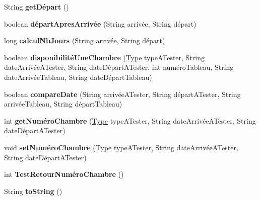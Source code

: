\begin{DoxyCompactItemize}
\item 
String {\bfseries get\+Départ} ()\hypertarget{classchambre_1_1_chambre_ac4f1540d86b148a6bcf83d84f3c5a512}{}\label{classchambre_1_1_chambre_ac4f1540d86b148a6bcf83d84f3c5a512}

\item 
boolean {\bfseries départ\+Apres\+Arrivée} (String arrivée, String départ)\hypertarget{classchambre_1_1_chambre_a9743685f40e65b19febe5d88e4833a0b}{}\label{classchambre_1_1_chambre_a9743685f40e65b19febe5d88e4833a0b}

\item 
long {\bfseries calcul\+Nb\+Jours} (String arrivée, String départ)\hypertarget{classchambre_1_1_chambre_a793aabc721c19132c61965d903994ac1}{}\label{classchambre_1_1_chambre_a793aabc721c19132c61965d903994ac1}

\item 
boolean {\bfseries disponibilité\+Une\+Chambre} (\hyperlink{enumchambre_1_1_chambre_1_1_type}{Type} type\+A\+Tester, String date\+Arrivée\+A\+Tester, String date\+Départ\+A\+Tester, int numéro\+Tableau, String date\+Arrivée\+Tableau, String date\+Départ\+Tableau)\hypertarget{classchambre_1_1_chambre_af0f6b23009a6ccc1a14fa158d89314ab}{}\label{classchambre_1_1_chambre_af0f6b23009a6ccc1a14fa158d89314ab}

\item 
boolean {\bfseries compare\+Date} (String arrivée\+A\+Tester, String départ\+A\+Tester, String arrivée\+Tableau, String départ\+Tableau)\hypertarget{classchambre_1_1_chambre_ad1af4648ca1f52439d13c10549e0fbcf}{}\label{classchambre_1_1_chambre_ad1af4648ca1f52439d13c10549e0fbcf}

\item 
int {\bfseries get\+Numéro\+Chambre} (\hyperlink{enumchambre_1_1_chambre_1_1_type}{Type} type\+A\+Tester, String date\+Arrivée\+A\+Tester, String date\+Départ\+A\+Tester)\hypertarget{classchambre_1_1_chambre_ab37177f79e74c2b861e50b5b62f0a75a}{}\label{classchambre_1_1_chambre_ab37177f79e74c2b861e50b5b62f0a75a}

\item 
void {\bfseries set\+Numéro\+Chambre} (\hyperlink{enumchambre_1_1_chambre_1_1_type}{Type} type\+A\+Tester, String date\+Arrivée\+A\+Tester, String date\+Départ\+A\+Tester)\hypertarget{classchambre_1_1_chambre_a9faa902b212b252dff41d0853e51687f}{}\label{classchambre_1_1_chambre_a9faa902b212b252dff41d0853e51687f}

\item 
int {\bfseries Test\+Retour\+Numéro\+Chambre} ()\hypertarget{classchambre_1_1_chambre_a96d4df9b6ec946bf01604cbfa85c8b00}{}\label{classchambre_1_1_chambre_a96d4df9b6ec946bf01604cbfa85c8b00}

\item 
String {\bfseries to\+String} ()\hypertarget{classchambre_1_1_chambre_aae6de00a7aad0dae0f9cc065c90a18d0}{}\label{classchambre_1_1_chambre_aae6de00a7aad0dae0f9cc065c90a18d0}

\end{DoxyCompactItemize}
